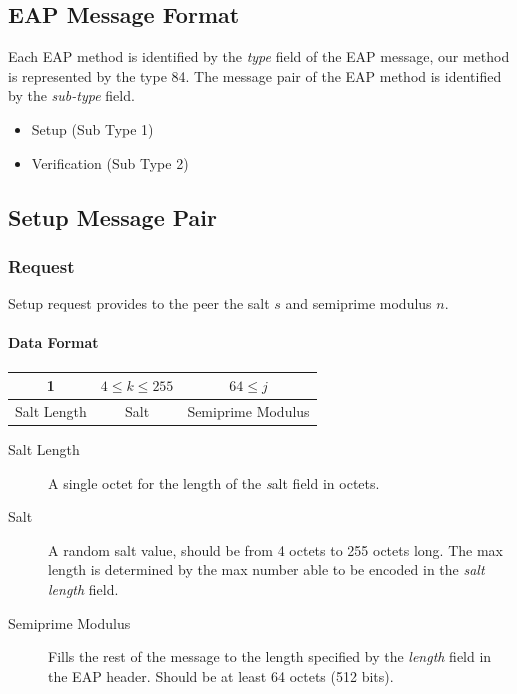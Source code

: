 \newpage
\subsection{EAP Message Format}
Each EAP method is identified by the \textit{type} field of the EAP message, our method is represented by the type 84.
The message pair of the EAP method is identified by the \textit{sub-type} field.

\begin{itemize}
	\item Setup (Sub Type 1)
	\item Verification (Sub Type 2)
\end{itemize}

\subsection{Setup Message Pair}

%

\subsubsection{Request} Setup request provides to the peer the salt $s$ and semiprime modulus $n$.

\paragraph{Data Format}

\begin{center}
\begin{tabular}{|c|c|c|}
	\hline
	1 & $4 \le k \le 255 $ & $64 \le j$\\ %
	\hline
	Salt Length & Salt & Semiprime Modulus\\
	\hline
\end{tabular}
\end{center}

\begin{description}
	\item[Salt Length] A single octet for the length of the \textit salt field in octets.
	\item[Salt] A random salt value, should be from 4 octets to 255 octets long.
The max length is determined by the max number able to be encoded in the \textit {salt length} field.
	\item[Semiprime Modulus] Fills the rest of the message to the length specified by the \textit{length} field in the EAP header. %
Should be at least 64 octets (512 bits).
\end{description}

